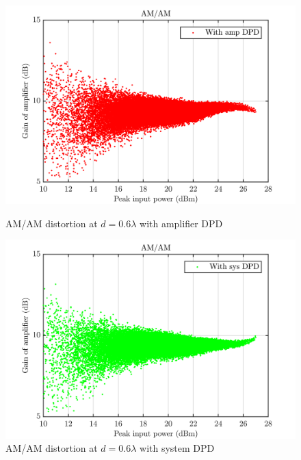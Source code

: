 \begin{figure}[H]
  \centering
  \begin{minipage}[b]{0.5\textwidth}
	\includegraphics[scale = 0.5]{figures/measurement/cree/meas3/amam_amp_dpd_0p6.png}
	\caption{AM/AM distortion at $d = 0.6\lambda$ with amplifier DPD}	
    \label{fig:meas4_amam5_3}
  \end{minipage}
  \hfill
  \begin{minipage}[b]{0.4\textwidth}
	\includegraphics[scale = 0.5]{figures/measurement/cree/meas3/amam_sys_dpd_0p6.png}
	\caption{AM/AM distortion at $d = 0.6\lambda$ with system DPD}
    \label{fig:meas4_amam6_3}
  \end{minipage}
\end{figure}


